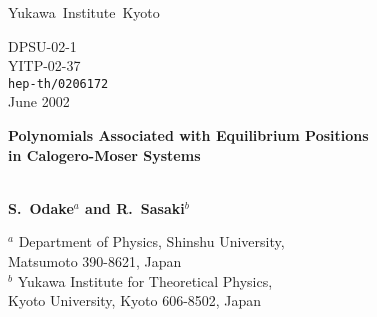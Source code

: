 \documentclass[a4paper,12pt]{article}
\begin{document}
\baselineskip=20pt

\newcommand{\preprint}{
   \begin{flushleft}
     \elevenmib Yukawa\, Institute\, Kyoto\\
   \end{flushleft}\vspace{-1.3cm}
   \begin{flushright}\normalsize  \sf
     DPSU-02-1\\
     YITP-02-37\\
     {\tt hep-th/0206172} \\ June 2002
   \end{flushright}}
\newcommand{\Title}[1]{{\baselineskip=26pt
   \begin{center} \Large \bf #1 \\ \ \\ \end{center}}}
\newcommand{\Author}{\begin{center}
   \large \bf S.~Odake${}^a$ and R.~Sasaki${}^b$ \end{center}}
\newcommand{\Address}{\begin{center}
     $^a$ Department of Physics, Shinshu University,\\
     Matsumoto 390-8621, Japan\\
     ${}^b$ Yukawa Institute for Theoretical Physics,\\
     Kyoto University, Kyoto 606-8502, Japan
   \end{center}}
\newcommand{\Accepted}[1]{\begin{center}
   {\large \sf #1}\\ \vspace{1mm}{\small \sf Accepted for Publication}
   \end{center}}

\preprint
\thispagestyle{empty}
\bigskip\bigskip\bigskip

\Title{Polynomials Associated with Equilibrium Positions\\
   in Calogero-Moser Systems}
\Author

\Address
\vspace{1cm}
\end{document}
